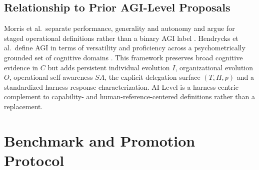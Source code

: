 \subsection{Relationship to Prior AGI-Level Proposals}

Morris et al.\ separate performance, generality and autonomy and argue for staged operational definitions rather than a binary AGI label \citep{morris2024levels}. Hendrycks et al.\ define AGI in terms of versatility and proficiency across a psychometrically grounded set of cognitive domains \citep{hendrycks2025agi}. This framework preserves broad cognitive evidence in $C$ but adds persistent individual evolution $I$, organizational evolution $O$, operational self-awareness $SA$, the explicit delegation surface $(T,H,p)$ and a standardized harness-response characterization. AI-Level is a harness-centric complement to capability- and human-reference-centered definitions rather than a replacement.

\section{Benchmark and Promotion Protocol}\label{sec:protocol}

